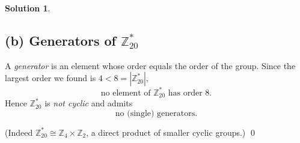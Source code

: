 \documentclass[12pt]{article}
\theoremstyle{definition} %
\newtheorem{solution}{Solution}
\theoremstyle{plain} %
\begin{document}
\begin{solution}
                \subsection*{(b)  Generators of $\mathbb{Z}_{20}^{\ast}$}
                
                A \emph{generator} is an element whose order equals the order of the
                group.  
                Since the largest order we found is $4<8=|\mathbb{Z}_{20}^{\ast}|$,  
                \[
                   \text{no element of }\mathbb{Z}_{20}^{\ast}\text{ has order }8.
                \]
                Hence $\mathbb{Z}_{20}^{\ast}$ is \emph{not cyclic} and admits
                \[
                   \boxed{\text{no (single) generators.}}
                \]
                
                (Indeed $\mathbb{Z}_{20}^{\ast}\cong\mathbb{Z}_{4}\times\mathbb{Z}_{2}$, a direct product of
                smaller cyclic groups.)
                \qed
                \end{solution}
\end{document}
